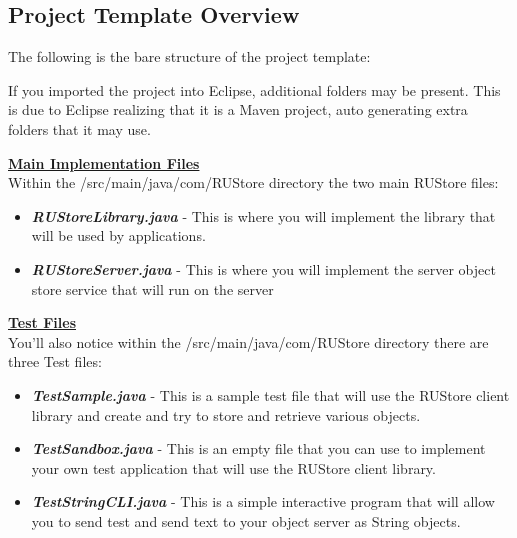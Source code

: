 \documentclass{article}
\begin{document}
\subsection{Project Template Overview}

The following is the bare structure of the project template: \\


\begin{info}[Notice:]
If you imported the project into Eclipse, additional folders may be present. This is due to Eclipse realizing that it is a Maven project, auto generating extra folders that it may use.
\end{info}

\noindent \textbf{\underline{Main Implementation Files}} \vspace{0.2cm} \\
\noindent Within the /src/main/java/com/RUStore directory the two main RUStore files:
\begin{itemize}
\item \textbf{\textit{RUStoreLibrary.java}} - This is where you will implement the library that will be used by applications. 
\item \textbf{\textit{RUStoreServer.java}} - This is where you will implement the server object store service that will run on the server\\
\end{itemize}

\noindent \textbf{\underline{Test Files}} \vspace{0.2cm} \\
\noindent You'll also notice within the /src/main/java/com/RUStore directory there are three Test files:
\begin{itemize}
\item \textbf{\textit{TestSample.java}} - This is a sample test file that will use the RUStore client library and create and try to store and retrieve various objects. 
\item \textbf{\textit{TestSandbox.java}} - This is an empty file that you can use to implement your own test application that will use the RUStore client library. 
\item \textbf{\textit{TestStringCLI.java}} - This is a simple interactive program that will allow you to send test and send text to your object server as String objects.
\end{itemize}
\end{document}
